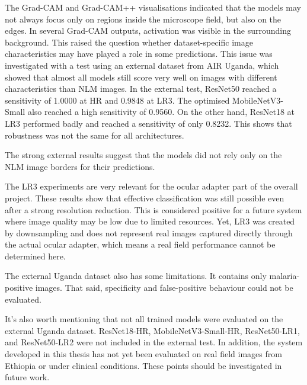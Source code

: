 The Grad-CAM and Grad-CAM++ visualisations indicated that the models may not always focus only on regions inside the microscope field, but also on the edges. In several Grad-CAM outputs, activation was visible in the surrounding background. This raised the question whether dataset-specific image characteristics may have played a role in some predictions. This issue was investigated with a test using an external dataset from AIR Uganda, which showed that almost all models still score very well on images with different characteristics than NLM images. In the external test, ResNet50 reached a sensitivity of 1.0000 at HR and 0.9848 at LR3. The optimised MobileNetV3-Small also reached a high sensitivity of 0.9560. On the other hand, ResNet18 at LR3 performed badly and reached a sensitivity of only 0.8232. This shows that robustness was not the same for all architectures.  

The strong external results suggest that the models did not rely only on the NLM image borders for their predictions.

The LR3 experiments are very relevant for the ocular adapter part of the overall project. These results show that effective classification was still possible even after a strong resolution reduction. This is considered positive for a future system where image quality may be low due to limited resources. Yet, LR3 was created by downsampling and does not represent real images captured directly through the actual ocular adapter, which means a real field performance cannot be determined here.

The external Uganda dataset also has some limitations. It contains only malaria-positive images. That said, specificity and false-positive behaviour could not be evaluated. 

It's also worth mentioning that not all trained models were evaluated on the external Uganda dataset. ResNet18-HR, MobileNetV3-Small-HR, ResNet50-LR1, and ResNet50-LR2 were not included in the external test. In addition, the system developed in this thesis has not yet been evaluated on real field images from Ethiopia or under clinical conditions. These points should be investigated in future work.




